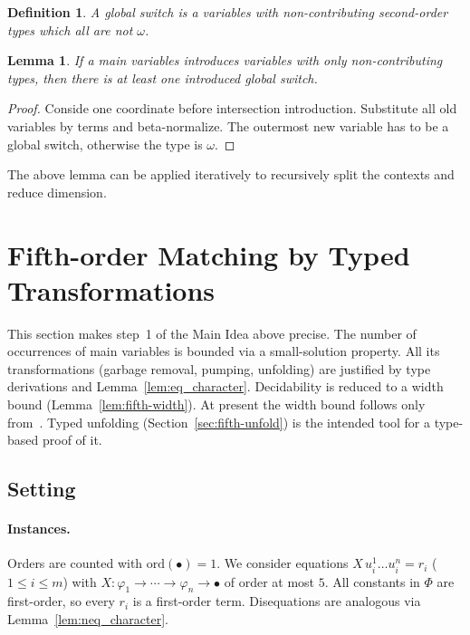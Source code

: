 \documentclass[10pt,a4paper]{article}
\theoremstyle{plain}%
\newtheorem{definition}[theorem]{Definition}
\newtheorem{lemma}[theorem]{Lemma}
\begin{document}
\begin{definition}
A global switch is a variables with non-contributing second-order types which all are not $\omega$.
\end{definition}

\begin{lemma}
If a main variables introduces variables with only non-contributing types, then there is at least one introduced global switch.
\end{lemma}

\begin{proof}
Conside one coordinate before intersection introduction.
Substitute all old variables by terms and beta-normalize.
The outermost new variable has to be a global switch, otherwise the type is $\omega$.
\end{proof}

The above lemma can be applied iteratively to recursively split the contexts and reduce dimension.

\newpage

\providecommand{\tgt}{\mathsf{tgt}}
\providecommand{\Inst}{\mathsf{Inst}}
\providecommand{\Sig}{\mathsf{Sig}}
\providecommand{\FV}{\mathsf{FV}}
\providecommand{\Pos}{\mathsf{Pos}}

\section{Fifth-order Matching by Typed Transformations}
\label{sec:fifth-typed}

This section makes step~1 of the Main Idea above precise.
The number of occurrences of main variables is bounded via a small-solution property.
All its transformations (garbage removal, pumping, unfolding) are justified by type derivations and Lemma~\ref{lem:eq_character}.
Decidability is reduced to a width bound (Lemma~\ref{lem:fifth-width}).
At present the width bound follows only from~\cite{stirling2009}.
Typed unfolding (Section~\ref{sec:fifth-unfold}) is the intended tool for a type-based proof of it.

\subsection{Setting}

\paragraph{Instances.}
Orders are counted with $\mathrm{ord}(\bullet) = 1$.
We consider equations $X\,u_i^1\ldots u_i^n = r_i$ ($1 \le i \le m$) with $X : \varphi_1 \to \cdots \to \varphi_n \to \bullet$ of order at most $5$.
All constants in $\Phi$ are first-order, so every $r_i$ is a first-order term.
Disequations are analogous via Lemma~\ref{lem:neq_character}.
\end{document}
